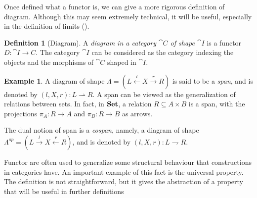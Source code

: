 \documentclass[a4paper, twoside,openright]{report}
\theoremstyle{plain}
\theoremstyle{definition}
\newtheorem{definition}[theorem]{Definition}
\newtheorem{example}[theorem]{Example}
\begin{document}
Once defined what a functor is, we can give a more rigorous definition of diagram. Although this may seem extremely technical, it will be useful, especially in the definition of limits ().

\begin{definition}[Diagram]\label{def:diagram}
    A \emph{diagram in a category $\cat C$ of shape $\cat I$} is a functor $D: \cat{I \rightarrow C}$.
    The category $\cat I$ can be considered as the category indexing the objects and the morphisms of $\cat C$ shaped in $\cat I$.
\end{definition}

\begin{example}\label{ex: span}
    A diagram of shape $\Lambda = (L \xleftarrow{l} X \xrightarrow{r} R)$ is said to be a \emph{span}, and is denoted by $(l, X, r): L \rightharpoonup R$.
    A span can be viewed as the generalization of relations between sets. In fact, in $\mathbf{Set}$, a relation $R \subseteq A \times B$ is a span, with the projections $\pi_A : R \rightarrow A$ and $\pi_B : R \rightarrow B$ as arrows.
    
    The dual notion of span is a \emph{cospan}, namely, a diagram of shape $\Lambda^{op} = (L \xrightarrow{l} X \xleftarrow{r} R)$, and is denoted by $(l, X, r): L \rightharpoondown R$.
\end{example}

Functor are often used to generalize some structural behaviour that constructions in categories have. An important example of this fact is the universal property. The definition is not straightforward, but it gives the abstraction of a property that will be useful in further definitions%
\end{document}

